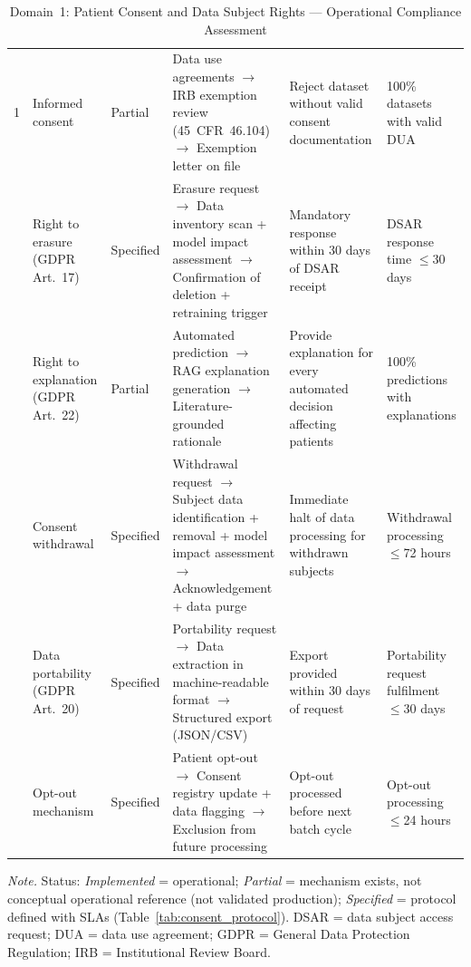 \iffalse
\begin{table}[H]
\tablestripes
\tablefontsize
\caption[Patient Consent and Data Subject Rights Assessment]{Domain~1: Patient Consent and Data Subject Rights --- Operational Compliance Assessment}
\begin{tabularx}{\textwidth}{@{} p{0.4cm} p{2cm} p{1.4cm} L L p{1.8cm} @{}}
\toprule
\thead{\#} &  &  &  &  &  \\
 & Informed consent & Partial & Data use agreements $\to$ IRB exemption review (45~CFR~46.104) $\to$ Exemption letter on file & Reject dataset without valid consent documentation & 100\% datasets with valid DUA \\
 & Right to erasure (GDPR Art.~17) & Specified & Erasure request $\to$ Data inventory scan + model impact assessment $\to$ Confirmation of deletion + retraining trigger & Mandatory response within 30 days of DSAR receipt & DSAR response time $\leq$30 days \\
 & Right to explanation (GDPR Art.~22) & Partial & Automated prediction $\to$ RAG explanation generation $\to$ Literature-grounded rationale & Provide explanation for every automated decision affecting patients & 100\% predictions with explanations \\
 & Consent withdrawal & Specified & Withdrawal request $\to$ Subject data identification + removal + model impact assessment $\to$ Acknowledgement + data purge & Immediate halt of data processing for withdrawn subjects & Withdrawal processing $\leq$72 hours \\
 & Data portability (GDPR Art.~20) & Specified & Portability request $\to$ Data extraction in machine-readable format $\to$ Structured export (JSON/CSV) & Export provided within 30 days of request & Portability request fulfilment $\leq$30 days \\
 & Opt-out mechanism & Specified & Patient opt-out $\to$ Consent registry update + data flagging $\to$ Exclusion from future processing & Opt-out processed before next batch cycle & Opt-out processing $\leq$24 hours \\
\bottomrule
\end{tabularx}
\vspace{0.5em}\noindent\textit{Note.} Status: \textit{Implemented} = operational; \textit{Partial} = mechanism exists, not conceptual operational reference (not validated production); \textit{Specified} = protocol defined with SLAs (Table~\ref{tab:consent_protocol}). DSAR = data subject access request; DUA = data use agreement; GDPR = General Data Protection Regulation; IRB = Institutional Review Board.
\end{table}

